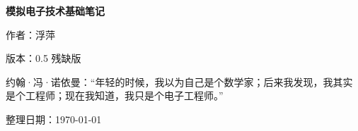 \begin{titlepage}
    \centering
    \vspace*{4cm}
    {\Huge \bfseries 模拟电子技术基础笔记 \par}
    \vspace{2cm}
    {\Large \itshape  \par}
    \vspace{1.5cm}
    {\Large 作者：浮萍 \par}
    \vspace{0.5cm}
    {\Large 版本：0.5 残缺版 \par}
    \vspace{1cm}
    {\large \color{gray} 约翰·冯·诺依曼：“年轻的时候，我以为自己是个数学家；后来我发现，我其实是个工程师；现在我知道，我只是个电子工程师。” \par}
    \vfill
    {\Large 整理日期：\today \par}
\end{titlepage}